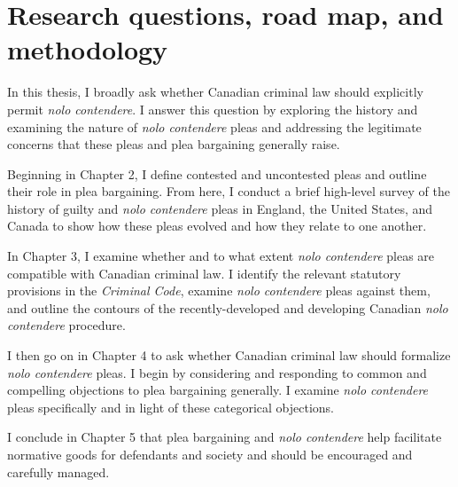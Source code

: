 \section{Research questions, road map, and methodology}

In this thesis, I broadly ask whether Canadian criminal law should explicitly permit \textit{nolo contendere}. I answer this question by exploring the history and examining the nature of \textit{nolo contendere} pleas and addressing the legitimate concerns that these pleas and plea bargaining generally raise.

Beginning in Chapter 2, I define contested and uncontested pleas and outline their role in plea bargaining. From here, I conduct a brief high-level survey of the history of guilty and \textit{nolo contendere} pleas in England, the United States, and Canada to show how these pleas evolved and how they relate to one another. 

In Chapter 3, I examine whether and to what extent \textit{nolo contendere} pleas are compatible with Canadian criminal law. I identify the relevant statutory provisions in the \textit{Criminal Code}, examine \textit{nolo contendere} pleas against them, and outline the contours of the recently-developed and developing Canadian \textit{nolo contendere} procedure.

I then go on in Chapter 4 to ask whether Canadian criminal law should formalize \textit{nolo contendere} pleas. I begin by considering and responding to common and compelling objections to plea bargaining generally. I examine \textit{nolo contendere} pleas specifically and in light of these categorical objections. 

I conclude in Chapter 5 that plea bargaining and \textit{nolo contendere} help facilitate normative goods for defendants and society and should be encouraged and carefully managed.